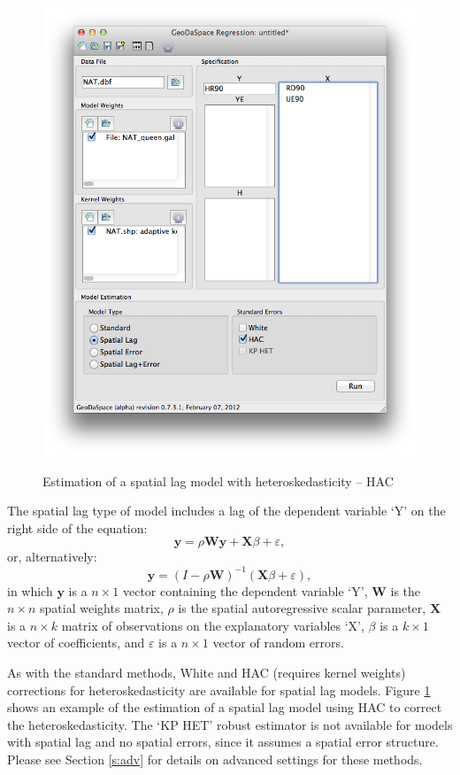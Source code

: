\documentclass{article}
\begin{document}
\begin{figure}[htb]
\caption{Estimation of a spatial lag model with heteroskedasticity -- HAC}
\label{f:haclag}
\begin{center}
\includegraphics[width=0.7\linewidth]{haclag.png}\\
\end{center}
\end{figure}

The spatial lag type of model includes a lag of the dependent variable `Y' on the right side of the equation:
\begin{equation}
\mathbf{y} =  \rho \mathbf{W} \mathbf{y} + \mathbf{X}\beta + \varepsilon,
\end{equation}
or, alternatively:
\begin{equation}
\mathbf{y} =  (I - \rho \mathbf{W})^{-1} (\mathbf{X}\beta + \varepsilon),
\end{equation}
in which $\mathbf{y}$ is a $n \times 1$ vector containing the dependent variable `Y', $\mathbf{W}$ is the $n \times n$ spatial weights matrix, $\rho$ is the spatial autoregressive scalar parameter, $\mathbf{X}$ is a $n \times k$ matrix of observations on the explanatory variables `X', $\beta$ is a $k \times 1$ vector of coefficients, and $\varepsilon$ is a $n \times 1$ vector of random errors.

As with the standard methods, White and HAC (requires kernel weights) corrections for heteroskedasticity are available for spatial lag models. Figure \ref{f:haclag} shows an example of the estimation of a spatial lag model using HAC to correct the heteroskedasticity. The `KP HET' robust estimator is not available for models with spatial lag and no spatial errors, since it assumes a spatial error structure. Please see Section \ref{s:adv} for details on advanced settings for these methods.
\FloatBarrier
\end{document}
